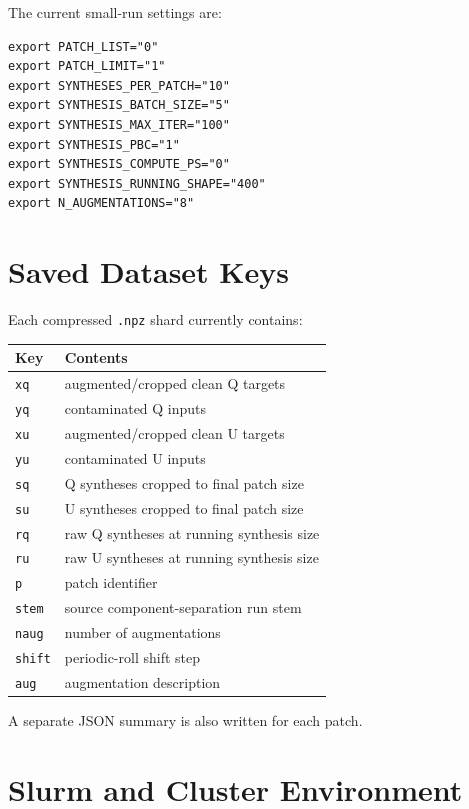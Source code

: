 \documentclass[11pt]{article}
\begin{document}
The current small-run settings are:

\begin{lstlisting}
export PATCH_LIST="0"
export PATCH_LIMIT="1"
export SYNTHESES_PER_PATCH="10"
export SYNTHESIS_BATCH_SIZE="5"
export SYNTHESIS_MAX_ITER="100"
export SYNTHESIS_PBC="1"
export SYNTHESIS_COMPUTE_PS="0"
export SYNTHESIS_RUNNING_SHAPE="400"
export N_AUGMENTATIONS="8"
\end{lstlisting}

\section{Saved Dataset Keys}

Each compressed \texttt{.npz} shard currently contains:

\begin{center}
\begin{tabular}{ll}
\toprule
Key & Contents \\
\midrule
\texttt{xq} & augmented/cropped clean Q targets \\
\texttt{yq} & contaminated Q inputs \\
\texttt{xu} & augmented/cropped clean U targets \\
\texttt{yu} & contaminated U inputs \\
\texttt{sq} & Q syntheses cropped to final patch size \\
\texttt{su} & U syntheses cropped to final patch size \\
\texttt{rq} & raw Q syntheses at running synthesis size \\
\texttt{ru} & raw U syntheses at running synthesis size \\
\texttt{p} & patch identifier \\
\texttt{stem} & source component-separation run stem \\
\texttt{naug} & number of augmentations \\
\texttt{shift} & periodic-roll shift step \\
\texttt{aug} & augmentation description \\
\bottomrule
\end{tabular}
\end{center}

A separate JSON summary is also written for each patch.

\section{Slurm and Cluster Environment}
\end{document}

